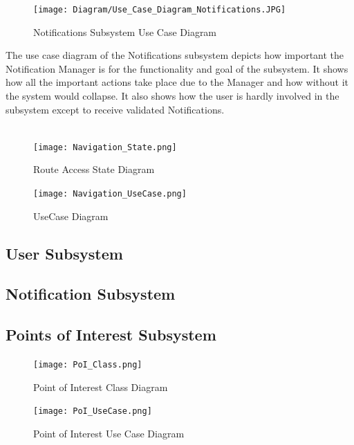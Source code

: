 \documentclass{article}
\begin{document}
				\begin{figure}[h!]
					\texttt{[image: Diagram/Use\_Case\_Diagram\_Notifications.JPG]}
					\caption{Notifications Subsystem Use Case Diagram}	
				\end{figure}
				{The use case diagram of the Notifications subsystem depicts how important the Notification Manager is for the functionality and goal of the subsystem. It shows how all the important actions take place due to the Manager and how without it the system would collapse. It also shows how the user is hardly involved in the subsystem except to receive validated Notifications.\\\\}
				
				\begin{figure}[H]
                     \texttt{[image: Navigation\_State.png]}
                     \caption{Route Access State Diagram}
					 \label{fig:navigation_state}
			    \end{figure}
			    
			    \begin{figure}[H]
                     \texttt{[image: Navigation\_UseCase.png]}
                     \caption{UseCase Diagram}
					 \label{fig:navigation_UseCase}
			    \end{figure}

			    
			\subsection{User Subsystem}\label{subsec:users}
			\subsection{Notification Subsystem}\label{subsec:notification}

			\newpage
			\subsection{Points of Interest Subsystem}\label{subsec:points of interest}
				\begin{figure}[H]
		 \texttt{[image: PoI\_Class.png]}
                     \caption{Point of Interest Class Diagram}
					 \label{fig:PoI_class}
			    \end{figure}

			\begin{figure}[H]
		 \texttt{[image: PoI\_UseCase.png]}
                     \caption{Point of Interest Use Case Diagram}
					 \label{fig:PoI_UseCase}
			    \end{figure}
\end{document}
